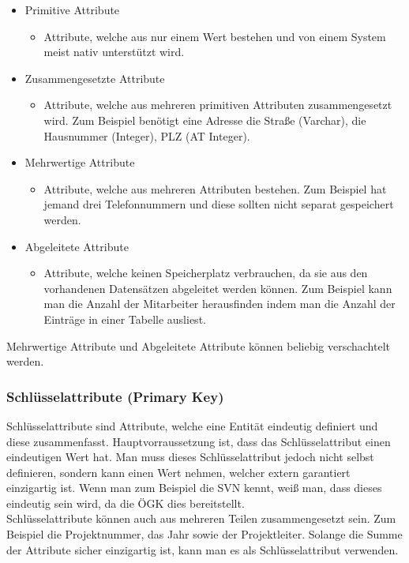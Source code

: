 \documentclass{article}
\begin{document}
	\begin{itemize}
		\item{Primitive Attribute}
		\begin{itemize}
			\item{Attribute, welche aus nur einem Wert bestehen und von einem System meist nativ unterstützt wird.}
		\end{itemize}
		\item{Zusammengesetzte Attribute}
		\begin{itemize}
			\item{Attribute, welche aus mehreren primitiven Attributen zusammengesetzt wird. Zum Beispiel benötigt eine Adresse die Straße (Varchar), die Hausnummer (Integer), PLZ (AT Integer).}
		\end{itemize}
		\item{Mehrwertige Attribute}
		\begin{itemize}
			\item{Attribute, welche aus mehreren Attributen bestehen. Zum Beispiel hat jemand drei Telefonnummern und diese sollten nicht separat gespeichert werden.}
		\end{itemize}
		\item{Abgeleitete Attribute}
		\begin{itemize}
			\item{Attribute, welche keinen Speicherplatz verbrauchen, da sie aus den vorhandenen Datensätzen abgeleitet werden können. Zum Beispiel kann man die Anzahl der Mitarbeiter herausfinden indem man die Anzahl der Einträge in einer Tabelle ausliest.}
		\end{itemize}
	\end{itemize}
	Mehrwertige Attribute und Abgeleitete Attribute können beliebig verschachtelt werden.
	\subsubsection{Schlüsselattribute (Primary Key)}
	Schlüsselattribute sind Attribute, welche eine Entität eindeutig definiert und diese zusammenfasst. Hauptvorraussetzung ist, dass das Schlüsselattribut einen eindeutigen Wert hat. Man muss dieses Schlüsselattribut jedoch nicht selbst definieren, sondern kann einen Wert nehmen, welcher extern garantiert einzigartig ist. Wenn man zum Beispiel die SVN kennt, weiß man, dass dieses eindeutig sein wird, da die ÖGK dies bereitstellt. \\
	Schlüsselattribute können auch aus mehreren Teilen zusammengesetzt sein. Zum Beispiel die Projektnummer, das Jahr sowie der Projektleiter. Solange die Summe der Attribute sicher einzigartig ist, kann man es als Schlüsselattribut verwenden.
\end{document}
